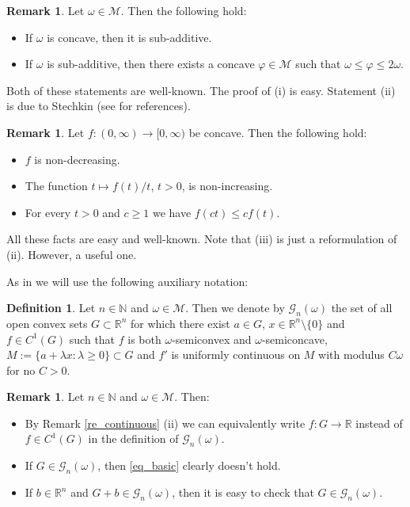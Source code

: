 \documentclass[10pt,a4paper]{amsart}
\theoremstyle{definition}
\newtheorem{definition}[theorem]{Definition}
\newtheorem{remark}[theorem]{Remark}
\newcommand{\R}{\mathbb{R}}
\newcommand{\N}{\mathbb{N}}
\newcommand{\M}{\mathcal{M}}
\begin{document}
\begin{remark}\label{re_additive}
Let $ \omega\in\M $. Then the following hold:
\begin{itemize}
\item[(i)] If $ \omega $ is concave, then it is sub-additive.
\item[(ii)] If $ \omega $ is sub-additive, then there exists a concave $ \varphi\in\M $ such that $ \omega\leq\varphi\leq 2\omega $.
\end{itemize}
Both of these statements are well-known. The proof of (i) is easy. Statement (ii) is due to Stechkin (see \cite[Lemma 2.3]{DZ} for references).
\end{remark}


\begin{remark}\label{re_concave}
Let $ f:(0,\infty)\to [0,\infty) $ be concave. Then the following hold:
\begin{itemize}
\item[(i)] $ f $ is non-decreasing.
\item[(ii)] The function $ t\mapsto f(t)/t $, $ t>0 $, is non-increasing.
\item[(iii)] For every $ t>0 $ and $ c\geq 1 $ we have $ f(ct)\leq cf(t) $.
\end{itemize}
All these facts are easy and well-known. Note that (iii) is just a reformulation of (ii). However, a useful one.
\end{remark}



As in \cite{KZ} we will use the following auxiliary notation:

\begin{definition}\label{de_gn}
Let $ n\in\N $ and $ \omega\in\M $. Then we denote by $ \mathcal{G}_n(\omega) $ the set of all open convex sets $ G\subset\R^n $ for which there exist $ a\in G $, $ x\in\R^n\setminus\lbrace 0\rbrace $ and $ f\in C^1(G) $ such that $ f $ is both $ \omega $-semiconvex and $ \omega $-semiconcave, $ M:=\lbrace a+\lambda x:\lambda\geq 0\rbrace\subset G $ and $ f' $ is uniformly continuous on $ M $ with modulus $ C\omega $ for no $ C>0 $.
\end{definition}


\begin{remark}\label{re_gn}
Let $ n\in\N $ and $ \omega\in\M $. Then:
\begin{itemize}
\item[(i)] By Remark \ref{re_continuous} (ii) we can equivalently write $ f:G\to\R $ instead of $ f\in C^1(G) $ in the definition of $ \mathcal{G}_n(\omega) $.
\item[(ii)] If $ G\in\mathcal{G}_n(\omega) $, then \eqref{eq_basic} clearly doesn't hold.
\item[(iii)] If $ b\in\R^n $ and $ G+b\in\mathcal{G}_n(\omega) $, then it is easy to check that $ G\in\mathcal{G}_n(\omega) $.
\end{itemize}
\end{remark}
\end{document}
